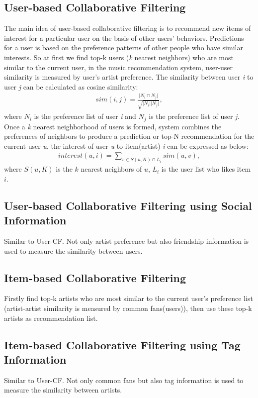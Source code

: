 \documentclass{sig-alternate}
\begin{document}
\subsection{User-based Collaborative Filtering}
The main idea of user-based collaborative filtering is to recommend new items of interest for a particular user on the basis of other users' behaviors. Predictions for a user is based on the preference patterns of other people who have similar interests. So at first we find top-k users (\textsl{k} nearest neighbors) who are most similar to the current user, in the music recommendation system, user-user similarity is measured by user's artist preference. The similarity between user \textsl{i} to user \textsl{j} can be calculated as cosine similarity:
\begin{gather*}
sim(i, j)= \frac{\vert N_i  \cap N_j \vert}{\sqrt{\vert N_i \vert \vert N_j \vert}},
\end{gather*}
\indent where $N_i$ is the preference list of user \textsl{i} and $N_j$ is the preference list of user \textsl{j}.\\
\indent Once a \textsl{k} nearest neighborhood of users is formed, system combines the preferences of neighbors to produce a prediction or top-N recommendation for the current user \textsl{u}, the interest of user \textsl{u} to item(artist) \textsl{i} can be expressed as below:
\begin{gather*}
interest(u, i)= \sum_{v \in S(u, K) \cap L_i} sim(u, v),
\end{gather*}
\indent where $S(u, K)$ is the $k$ nearest neighbors of $u$, $L_i$ is the user list who likes item $i$.

\subsection{User-based Collaborative Filtering using Social Information}
Similar to User-CF. Not only artist preference but also friendship information is used to measure the similarity between users.

\subsection{Item-based Collaborative Filtering}
Firstly find top-k artists who are most similar to the current user’s preference list (artist-artist similarity is measured by common fans(users)), then use these top-k artists as recommendation list.

\subsection{Item-based Collaborative Filtering using Tag Information}
Similar to User-CF. Not only common fans but also tag information is used to measure the similarity between artists.
\end{document}

